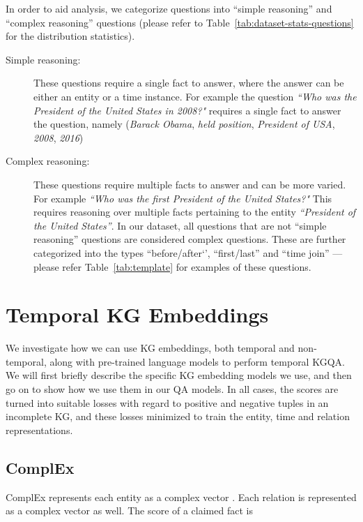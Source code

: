 \documentclass[11pt,a4paper]{article}
\begin{document}
In order to aid analysis, we categorize questions into ``simple reasoning'' and ``complex reasoning'' questions (please refer to Table~\ref{tab:dataset-stats-questions} for the distribution statistics). 
\begin{description}
\item[Simple reasoning:] These questions require a single fact to answer, where the answer can be either an entity or a time instance. For example the question \textit{``Who was the President of the United States in 2008?"} requires a single fact to answer the question, namely (\textit{Barack Obama}, \textit{held position}, \textit{President of USA}, \textit{2008}, \textit{2016})
\item[Complex reasoning:] These questions require multiple facts to answer and can be more varied. For example \textit{``Who was the first President of the United States?"}  This requires reasoning over multiple facts pertaining to the entity \textit{``President of the United States''}. In our dataset, all questions that are not ``simple reasoning'' questions are considered complex questions. These are further categorized into the types ``before/after`', ``first/last'' and ``time join'' --- please refer Table~\ref{tab:template} for examples of these questions.

\end{description}





\section{Temporal KG Embeddings}
\label{sec:temporal-kg-embeddings}
We investigate how we can use KG embeddings, both temporal and non-temporal, along with pre-trained language models to perform temporal KGQA.  We will first briefly describe the specific KG embedding models we use, and then go on to show how we use them in our QA models.  In all cases, the scores are turned into suitable losses with regard to positive and negative tuples in an incomplete KG, and these losses minimized to train the entity, time and relation representations.

\subsection{ComplEx}
\label{sec:complex}
ComplEx \citep{trouillon2016complex} represents each entity  as a complex vector .  Each relation  is represented as a complex vector  as well. The score  of a claimed fact  is
\end{document}
